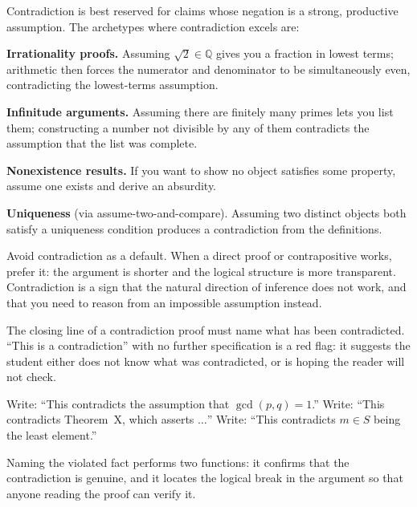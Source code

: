 \begin{remark}
Contradiction is best reserved for claims whose negation is
a strong, productive assumption. The archetypes where contradiction
excels are:

\medskip
\noindent \textbf{Irrationality proofs.} Assuming $\sqrt{2} \in \mathbb{Q}$
gives you a fraction in lowest terms; arithmetic then forces the
numerator and denominator to be simultaneously even, contradicting
the lowest-terms assumption.

\noindent \textbf{Infinitude arguments.} Assuming there are finitely many
primes lets you list them; constructing a number not divisible by any
of them contradicts the assumption that the list was complete.

\noindent \textbf{Nonexistence results.} If you want to show no object
satisfies some property, assume one exists and derive an absurdity.

\noindent \textbf{Uniqueness} (via assume-two-and-compare). Assuming two
distinct objects both satisfy a uniqueness condition produces a
contradiction from the definitions.

\medskip
\noindent
Avoid contradiction as a default. When a direct proof or contrapositive
works, prefer it: the argument is shorter and the logical structure is
more transparent. Contradiction is a sign that the natural direction
of inference does not work, and that you need to reason from an
impossible assumption instead.
\end{remark}

\begin{remark}
The closing line of a contradiction proof must name what has been
contradicted. ``This is a contradiction'' with no further specification
is a red flag: it suggests the student either does not know what was
contradicted, or is hoping the reader will not check.

Write: ``This contradicts the assumption that $\gcd(p,q) = 1$.''
Write: ``This contradicts Theorem~X, which asserts $\ldots$''
Write: ``This contradicts $m \in S$ being the least element.''

Naming the violated fact performs two functions: it confirms that the
contradiction is genuine, and it locates the logical break in the
argument so that anyone reading the proof can verify it.
\end{remark}

